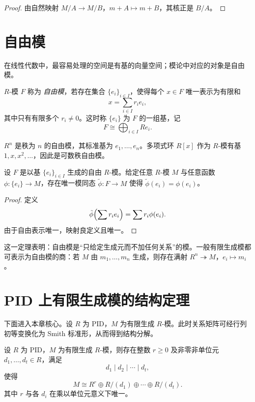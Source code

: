\begin{proof}
由自然映射 $M/A\to M/B$，$m+A\mapsto m+B$，其核正是 $B/A$。
\end{proof}

\section{自由模}

在线性代数中，最容易处理的空间是有基的向量空间；模论中对应的对象是自由模。

\begin{definition}
$R$-模 $F$ 称为 \emph{自由模}，若存在集合 $\{e_i\}_{i\in I}$，使得每个 $x\in F$ 唯一表示为有限和
\[
 x=\sum_{i\in I} r_ie_i,
\]
其中只有有限多个 $r_i\ne 0$。这时称 $\{e_i\}$ 为 $F$ 的一组基，记
\[
 F\cong \bigoplus_{i\in I} R e_i.
\]
\end{definition}

\begin{example}
$R^n$ 是秩为 $n$ 的自由模，其标准基为 $e_1,\dots,e_n$。多项式环 $R[x]$ 作为 $R$-模有基 $1,x,x^2,\dots$，因此是可数秩自由模。
\end{example}

\begin{proposition}[自由模的泛性质]
设 $F$ 是以基 $\{e_i\}_{i\in I}$ 生成的自由 $R$-模。给定任意 $R$-模 $M$ 与任意函数 $\phi:\{e_i\}\to M$，存在唯一模同态 $\tilde\phi:F\to M$ 使得 $\tilde\phi(e_i)=\phi(e_i)$。
\end{proposition}

\begin{proof}
定义
\[
 \tilde\phi\Bigl(\sum r_ie_i\Bigr)=\sum r_i\phi(e_i).
\]
由于自由表示唯一，映射良定义且唯一。
\end{proof}

\begin{remark}
这一定理表明：自由模是“只给定生成元而不加任何关系”的模。一般有限生成模都可表示为自由模的商：若 $M$ 由 $m_1,\dots,m_n$ 生成，则存在满射 $R^n\twoheadrightarrow M$，$e_i\mapsto m_i$。
\end{remark}

\section{PID 上有限生成模的结构定理}

下面进入本章核心。设 $R$ 为 PID，$M$ 为有限生成 $R$-模。此时关系矩阵可经行列初等变换化为 Smith 标准形，从而得到结构分解。

\begin{theorem}
设 $R$ 为 PID，$M$ 为有限生成 $R$-模，则存在整数 $r\ge 0$ 及非零非单位元 $d_1,\dots,d_t\in R$，满足
\[
 d_1\mid d_2\mid \cdots \mid d_t,
\]
使得
\[
 M\cong R^r\oplus R/(d_1)\oplus \cdots \oplus R/(d_t).
\]
其中 $r$ 与各 $d_i$ 在乘以单位元意义下唯一。
\end{theorem}


